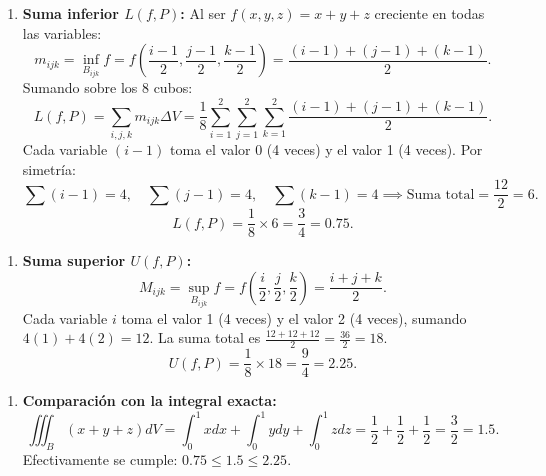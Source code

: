 \documentclass[11pt,a4paper]{article}
\begin{document}
\begin{enumerate}[label=\textbf{\arabic*.}]
\item \textbf{Suma inferior $L(f,P)$:}
Al ser $f(x,y,z) = x+y+z$ creciente en todas las variables:
\begin{equation*}
m_{ijk} = \inf_{B_{ijk}} f = f\left(\frac{i-1}{2}, \frac{j-1}{2}, \frac{k-1}{2}\right) = \frac{(i-1) + (j-1) + (k-1)}{2}.
\end{equation*}
Sumando sobre los 8 cubos:
\begin{equation*}
L(f,P) = \sum_{i,j,k} m_{ijk} \Delta V = \frac{1}{8} \sum_{i=1}^2 \sum_{j=1}^2 \sum_{k=1}^2 \frac{(i-1) + (j-1) + (k-1)}{2}.
\end{equation*}
Cada variable $(i-1)$ toma el valor 0 (4 veces) y el valor 1 (4 veces).
Por simetría:
\begin{equation*}
\sum (i-1) = 4, \quad \sum (j-1) = 4, \quad \sum (k-1) = 4 \implies \text{Suma total} = \frac{12}{2} = 6.
\end{equation*}
\begin{equation*}
L(f,P) = \frac{1}{8} \times 6 = \frac{3}{4} = 0.75.
\end{equation*}
\end{enumerate}

\begin{enumerate}[label=\textbf{\arabic*.}]
\item \textbf{Suma superior $U(f,P)$:}
\begin{equation*}
M_{ijk} = \sup_{B_{ijk}} f = f\left(\frac{i}{2}, \frac{j}{2}, \frac{k}{2}\right) = \frac{i + j + k}{2}.
\end{equation*}
Cada variable $i$ toma el valor 1 (4 veces) y el valor 2 (4 veces), sumando $4(1) + 4(2) = 12$.
La suma total es $\frac{12 + 12 + 12}{2} = \frac{36}{2} = 18$.
\begin{equation*}
U(f,P) = \frac{1}{8} \times 18 = \frac{9}{4} = 2.25.
\end{equation*}
\end{enumerate}

\begin{enumerate}[label=\textbf{\arabic*.}]
\item \textbf{Comparación con la integral exacta:}
\begin{equation*}
\iiint_B (x+y+z) dV = \int_0^1 x dx + \int_0^1 y dy + \int_0^1 z dz = \frac{1}{2} + \frac{1}{2} + \frac{1}{2} = \frac{3}{2} = 1.5.
\end{equation*}
Efectivamente se cumple: $0.75 \le 1.5 \le 2.25$.
\end{enumerate}
\end{document}

